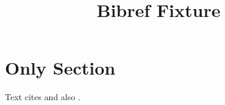 \documentclass{article}
\title{Bibref Fixture}
\begin{document}
\section{Only Section}
Text cites \cite{alpha} and also \citep{gamma}.

\end{document}
